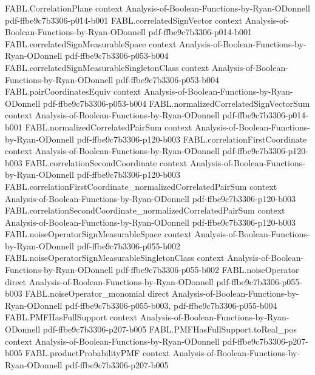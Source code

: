 \begin{theorem}
\proofstep
  {FABL.CorrelationPlane}
  {context}
  {Analysis-of-Boolean-Functions-by-Ryan-ODonnell}
  {pdf-ffbe9c7b3306-p014-b001}
\proofstep
  {FABL.correlatedSignVector}
  {context}
  {Analysis-of-Boolean-Functions-by-Ryan-ODonnell}
  {pdf-ffbe9c7b3306-p014-b001}
\proofstep
  {FABL.correlatedSignMeasurableSpace}
  {context}
  {Analysis-of-Boolean-Functions-by-Ryan-ODonnell}
  {pdf-ffbe9c7b3306-p053-b004}
\proofstep
  {FABL.correlatedSignMeasurableSingletonClass}
  {context}
  {Analysis-of-Boolean-Functions-by-Ryan-ODonnell}
  {pdf-ffbe9c7b3306-p053-b004}
\proofstep
  {FABL.pairCoordinatesEquiv}
  {context}
  {Analysis-of-Boolean-Functions-by-Ryan-ODonnell}
  {pdf-ffbe9c7b3306-p053-b004}
\proofstep
  {FABL.normalizedCorrelatedSignVectorSum}
  {context}
  {Analysis-of-Boolean-Functions-by-Ryan-ODonnell}
  {pdf-ffbe9c7b3306-p014-b001}
\proofstep
  {FABL.normalizedCorrelatedPairSum}
  {context}
  {Analysis-of-Boolean-Functions-by-Ryan-ODonnell}
  {pdf-ffbe9c7b3306-p120-b003}
\proofstep
  {FABL.correlationFirstCoordinate}
  {context}
  {Analysis-of-Boolean-Functions-by-Ryan-ODonnell}
  {pdf-ffbe9c7b3306-p120-b003}
\proofstep
  {FABL.correlationSecondCoordinate}
  {context}
  {Analysis-of-Boolean-Functions-by-Ryan-ODonnell}
  {pdf-ffbe9c7b3306-p120-b003}
\proofstep
  {FABL.correlationFirstCoordinate_normalizedCorrelatedPairSum}
  {context}
  {Analysis-of-Boolean-Functions-by-Ryan-ODonnell}
  {pdf-ffbe9c7b3306-p120-b003}
\proofstep
  {FABL.correlationSecondCoordinate_normalizedCorrelatedPairSum}
  {context}
  {Analysis-of-Boolean-Functions-by-Ryan-ODonnell}
  {pdf-ffbe9c7b3306-p120-b003}
\proofstep
  {FABL.noiseOperatorSignMeasurableSpace}
  {context}
  {Analysis-of-Boolean-Functions-by-Ryan-ODonnell}
  {pdf-ffbe9c7b3306-p055-b002}
\proofstep
  {FABL.noiseOperatorSignMeasurableSingletonClass}
  {context}
  {Analysis-of-Boolean-Functions-by-Ryan-ODonnell}
  {pdf-ffbe9c7b3306-p055-b002}
\proofstep
  {FABL.noiseOperator}
  {direct}
  {Analysis-of-Boolean-Functions-by-Ryan-ODonnell}
  {pdf-ffbe9c7b3306-p055-b003}
\proofstep
  {FABL.noiseOperator_monomial}
  {direct}
  {Analysis-of-Boolean-Functions-by-Ryan-ODonnell}
  {pdf-ffbe9c7b3306-p055-b003,
    pdf-ffbe9c7b3306-p055-b004}
\proofstep
  {FABL.PMFHasFullSupport}
  {context}
  {Analysis-of-Boolean-Functions-by-Ryan-ODonnell}
  {pdf-ffbe9c7b3306-p207-b005}
\proofstep
  {FABL.PMFHasFullSupport.toReal_pos}
  {context}
  {Analysis-of-Boolean-Functions-by-Ryan-ODonnell}
  {pdf-ffbe9c7b3306-p207-b005}
\proofstep
  {FABL.productProbabilityPMF}
  {context}
  {Analysis-of-Boolean-Functions-by-Ryan-ODonnell}
  {pdf-ffbe9c7b3306-p207-b005}

\end{theorem}
